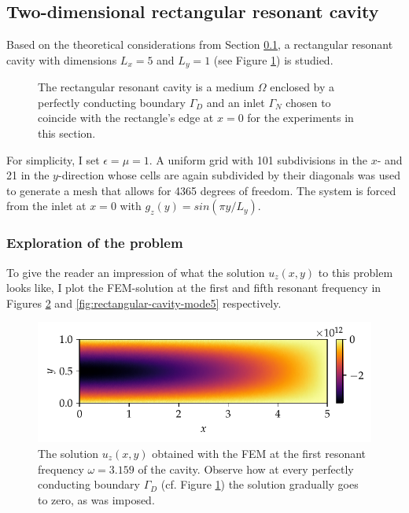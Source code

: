 \documentclass[11pt, a4paper]{article}
\begin{document}
\subsection{Two-dimensional rectangular resonant cavity}
\label{subsec:examples-rectangularcavity}

Based on the theoretical considerations from Section \ref{subsec:examples-rectangularcavity},
a rectangular resonant cavity with dimensions $L_x=5$ and $L_y=1$ (see Figure 
\ref{fig:rectangular_cavity}) is studied.
\begin{figure}[h]
    \centering
    
    \caption{The rectangular resonant cavity is a medium $\Omega$ enclosed
    by a perfectly conducting boundary $\Gamma_D$ and an inlet $\Gamma_N$
    chosen to coincide with the rectangle's edge at $x=0$ for the experiments in this
    section.}
    \label{fig:rectangular_cavity}
\end{figure}

For simplicity, I set $\epsilon=\mu=1$. A uniform grid with 101 subdivisions in
the $x$- and 21 in the $y$-direction whose cells are again subdivided by their
diagonals was used to generate a mesh that allows for 4365 degrees of freedom.
The system is forced from the inlet at $x=0$ with $g_z(y) = sin(\pi y / L_y)$.

\subsubsection{Exploration of the problem}
\label{subsubsec:exploration}

To give the reader an impression of what the solution $u_z(x, y)$ to this problem
looks like, I plot the \acrshort{FEM}-solution at the first and fifth resonant
frequency in Figures \ref{fig:rectangular-cavity-mode1} and \ref{fig:rectangular-cavity-mode5}
respectively.

\begin{figure}[ht]
    \includegraphics{plots/rectangular_cavity_mode1.pdf}
    \caption{The solution $u_z(x, y)$ obtained with the \acrshort{FEM} at the
    first resonant frequency $\omega = 3.159$ of the cavity. Observe how at
    every perfectly conducting boundary $\Gamma_D$ (cf. Figure
    \ref{fig:rectangular_cavity}) the solution gradually goes to zero, as was imposed.}
    \label{fig:rectangular-cavity-mode1}
\end{figure}
\end{document}
